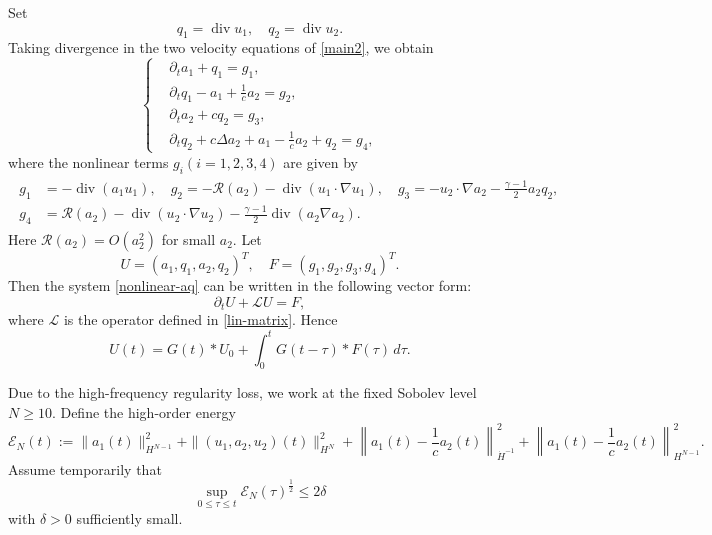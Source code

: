 \documentclass[10pt,reqno]{amsart}
\numberwithin{equation}{section}
\begin{document}
Set
\[
q_1=\operatorname{div}u_1,\quad q_2=\operatorname{div}u_2.
\]
Taking divergence in the two velocity equations of \eqref{main2}, we obtain
\begin{equation}\label{nonlinear-aq}
\left\{
\begin{aligned}
&\partial_t a_1+q_1=g_1,\\
&\partial_t q_1-a_1+\frac1c a_2=g_2,\\
&\partial_t a_2+cq_2=g_3,\\
&\partial_t q_2+c\Delta a_2+a_1-\frac1c a_2+q_2=g_4,
\end{aligned}
\right.
\end{equation}
where the nonlinear terms $g_i(i=1,2,3,4)$ are given by
\begin{align}\label{nonlinear-g}
\begin{aligned}
g_1&=-\operatorname{div}(a_1u_1),\quad g_2=-\mathcal R(a_2)-\operatorname{div}(u_1\cdot\nabla u_1),\quad g_3=-u_2\cdot\nabla a_2-\frac{\gamma-1}{2}a_2q_2,\\ g_4&=\mathcal R(a_2)-\operatorname{div}(u_2\cdot\nabla u_2)
-\frac{\gamma-1}{2}\operatorname{div}(a_2\nabla a_2).
\end{aligned}
\end{align}
Here $\mathcal R(a_2)=O(a_2^2)$ for small $a_2$. Let
\[
U=(a_1,q_1,a_2,q_2)^T,\quad F=(g_1,g_2,g_3,g_4)^T.
\]
Then the system \eqref{nonlinear-aq} can be written in the following vector form:
\[%
\partial_tU+\mathcal LU=F,
\]%
where $\mathcal L$ is the operator defined in \eqref{lin-matrix}.  Hence
\begin{equation}\label{nonlinear-duhamel}
U(t)=G(t)*U_0+\int_0^tG(t-\tau)*F(\tau)\,d\tau.
\end{equation}

Due to the high-frequency regularity loss, we work at the fixed Sobolev level $N\geq 10$. Define the high-order energy
\[%
\mathcal E_N(t) := \|a_1(t)\|_{H^{N-1}}^2 +\|(u_1,a_2,u_2)(t)\|_{H^N}^2 +\left\|a_1(t)-\frac1c a_2(t)\right\|_{\dot H^{-1}}^2 +\left\|a_1(t)-\frac1c a_2(t)\right\|_{H^{N-1}}^2.
\]%
Assume temporarily that
\begin{equation}\label{high-bootstrap}
\sup_{0\le\tau\le t}\mathcal E_N(\tau)^{\frac{1}{2}}\le 2\delta
\end{equation}
with $\delta>0$ sufficiently small.
\end{document}
